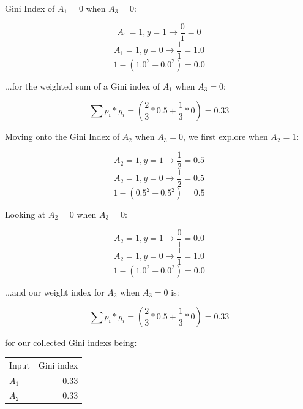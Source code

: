 \documentclass{article}
\begin{document}
\noindent Gini Index of $A_1=0$ when $A_3=0$:

\begin{equation}
    {A_1=1,y=1} \rightarrow \frac{0}{1} = 0
\end{equation}
\begin{equation}
    {A_1=1,y=0} \rightarrow \frac{1}{1} = 1.0
\end{equation}
\begin{equation}
    1 - (1.0^2 + 0.0^2) = 0.0
\end{equation}

\noindent ...for the weighted sum of a Gini index of $A_1$ when $A_3=0$:

\begin{equation}
    \sum p_i * g_i = (\frac{2}{3}*0.5 + \frac{1}{3}*0) = 0.33
\end{equation}

\noindent Moving onto the Gini Index of $A_2$ when $A_3=0$, we first explore when $A_2=1$:

\begin{equation}
    {A_2=1,y=1} \rightarrow \frac{1}{2} = 0.5
\end{equation}
\begin{equation}
    {A_2=1,y=0} \rightarrow \frac{1}{2} = 0.5
\end{equation}
\begin{equation}
    1 - (0.5^2 + 0.5^2) = 0.5
\end{equation}

\noindent Looking at $A_2=0$ when $A_3=0$:

\begin{equation}
    {A_2=1,y=1} \rightarrow \frac{0}{1} = 0.0
\end{equation}
\begin{equation}
    {A_2=1,y=0} \rightarrow \frac{1}{1} = 1.0
\end{equation}
\begin{equation}
    1 - (1.0^2 + 0.0^2) = 0.0
\end{equation}

\noindent ...and our weight index for $A_2$ when $A_3=0$ is:

\begin{equation}
    \sum p_i * g_i = (\frac{2}{3}*0.5 + \frac{1}{3}*0) = 0.33
\end{equation}

\noindent for our collected Gini indexs being:

\begin{center}
    \begin{tabular}{l r}
        Input & Gini index \\
        $A_1$ & 0.33 \\
        $A_2$ & 0.33 \\
    \end{tabular}
\end{center}
\end{document}

